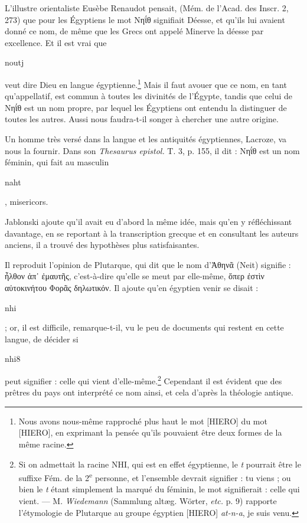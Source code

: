 \documentclass[a4paper, 11pt, oneside]{article}
\begin{document}
L'illustre orientaliste Eusèbe Renaudot pensait, (Mém. de l'Acad. des Inscr. 2, 273) que pour les Égyptiens le mot Νηΐθ signifiait Déesse, et qu'ils lui avaient donné ce nom, de même que les Grecs ont appelé Minerve la déesse par excellence. Et il est vrai que \begin{coptic}noutj\end{coptic} veut dire Dieu en langue égyptienne.\footnote{Nous avons nous-même rapproché plus haut le mot [HIERO] du mot [HIERO], en exprimant la pensée qu'ils pouvaient être deux formes de la même racine.} Mais il faut avouer que ce nom, en tant qu'appellatif, est commun à toutes les divinités de l'Égypte, tandis que celui de Νηΐθ est un nom propre, par lequel les Égyptiens ont entendu la distinguer de toutes les autres. Aussi nous faudra-t-il songer à chercher une autre origine.

Un homme très versé dans la langue et les antiquités égyptiennes, Lacroze, va nous la fournir. Dans son \emph{Thesaurus epistol.} T. 3, p. 155, il dit : Νηΐθ est un nom féminin, qui fait au masculin \begin{coptic}naht\end{coptic}, misericors.

Jablonski ajoute qu'il avait eu d'abord la même idée, mais qu'en y réfléchissant davantage, en se reportant à la transcription grecque et en consultant les auteurs anciens, il a trouvé des hypothèses plus satisfaisantes.

Il reproduit l'opinion de Plutarque, qui dit que le nom d'Ἀθηνᾶ (Neit) signifie : ἦλθον ἀπ᾿ ἐμαυτῆς, c'est-à-dire qu'elle se meut par elle-même, ὅπερ ἐστὶν αὐτοκινήτου Φορᾶς δηλωτικόν. Il ajoute qu'en égyptien venir se disait : \begin{coptic}nhi\end{coptic} ; or, il est difficile, remarque-t-il, vu le peu de documents qui restent en cette langue, de décider si \begin{coptic}nhi8\end{coptic} peut signifier : celle qui vient d'elle-même.\footnote{Si on admettait la racine NHI, qui est en effet égyptienne, le \emph{t} pourrait être le suffixe Fém. de la 2\textsuperscript{e} personne, et l'ensemble devrait signifier : tu viens ; ou bien le \emph{t} étant simplement la marqué du féminin, le mot signifierait : celle qui vient. --- M. \emph{Wiedemann} (Sammlung altæg. Wörter, \emph{etc.} p. 9) rapporte l'étymologie de Plutarque au groupe égyptien [HIERO] \emph{at-n-a}, je suis venu.} Cependant il est évident que des prêtres du pays ont interprété ce nom ainsi, et cela d'après la théologie antique.
\end{document}
